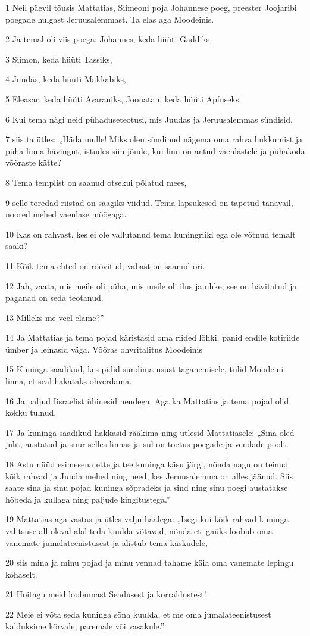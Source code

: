 \par 1 Neil päevil tõusis Mattatias, Siimeoni poja Johannese poeg, preester Joojaribi poegade hulgast Jeruusalemmast. Ta elas aga Moodeinis.
\par 2 Ja temal oli viis poega: Johannes, keda hüüti Gaddiks,
\par 3 Siimon, keda hüüti Tassiks,
\par 4 Juudas, keda hüüti Makkabiks,
\par 5 Eleasar, keda hüüti Avaraniks, Joonatan, keda hüüti Apfuseks.
\par 6 Kui tema nägi neid pühaduseteotusi, mis Juudas ja Jeruusalemmas sündisid,
\par 7 siis ta ütles: „Häda mulle! Miks olen sündinud nägema oma rahva hukkumist ja püha linna hävingut, istudes siin jõude, kui linn on antud vaenlastele ja pühakoda võõraste kätte?
\par 8 Tema templist on saanud otsekui põlatud mees,
\par 9 selle toredad riistad on saagiks viidud. Tema lapsukesed on tapetud tänavail, noored mehed vaenlase mõõgaga.
\par 10 Kas on rahvast, kes ei ole vallutanud tema kuningriiki ega ole võtnud temalt saaki?
\par 11 Kõik tema ehted on röövitud, vabast on saanud ori.
\par 12 Jah, vaata, mis meile oli püha, mis meile oli ilus ja uhke, see on hävitatud ja paganad on seda teotanud.
\par 13 Milleks me veel elame?” 
\par 14 Ja Mattatias ja tema pojad käristasid oma riided lõhki, panid endile kotiriide ümber ja leinasid väga. Võõras ohvritalitus Moodeinis
\par 15 Kuninga saadikud, kes pidid sundima usust taganemisele, tulid Moodeini linna, et seal hakataks ohverdama.
\par 16 Ja paljud Iisraelist ühinesid nendega. Aga ka Mattatias ja tema pojad olid kokku tulnud.
\par 17 Ja kuninga saadikud hakkasid rääkima ning ütlesid Mattatiasele: „Sina oled juht, austatud ja suur selles linnas ja sul on toetus poegade ja vendade poolt.
\par 18 Astu nüüd esimesena ette ja tee kuninga käsu järgi, nõnda nagu on teinud kõik rahvad ja Juuda mehed ning need, kes Jeruusalemma on alles jäänud. Siis saate sina ja sinu pojad kuninga sõpradeks ja sind ning sinu poegi austatakse hõbeda ja kullaga ning paljude kingitustega.”
\par 19 Mattatias aga vastas ja ütles valju häälega: „Isegi kui kõik rahvad kuninga valitsuse all oleval alal teda kuulda võtavad, nõnda et igaüks loobub oma vanemate jumalateenistusest ja alistub tema käskudele,
\par 20 siis mina ja minu pojad ja minu vennad tahame käia oma vanemate lepingu kohaselt.
\par 21 Hoitagu meid loobumast Seadusest ja korraldustest!
\par 22 Meie ei võta seda kuninga sõna kuulda, et me oma jumalateenistusest kalduksime kõrvale, paremale või vasakule.” 

